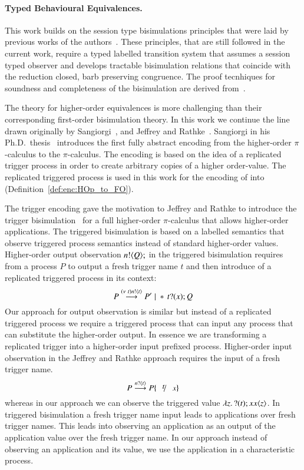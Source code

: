 \paragraph{Typed Behavioural Equivalences.}
This work builds on the session type bisimulations principles
that were laid by previous works of the
authors~\cite{dkphdthesis,DBLP:conf/forte/KouzapasYH11,KY13}.
These principles, that are still followed in the current work,
require a typed labelled transition system
that assumes a session typed observer and develops
tractable bisimulation relations that coincide with
the reduction closed, barb preserving congruence. The
proof tecnhiques for soundness and completeness of the bisimulation
are derived from~\cite{Hennessy07}.

The theory for higher-order equivalences is more challenging than
their corresponding first-order bisimulation theory.
In this work we continue the line drawn originally by
Sangiorgi~\cite{San96H,SangiorgiD:expmpa},
and Jeffrey and Rathke~\cite{DBLP:journals/lmcs/JeffreyR05}.
Sangiorgi in his Ph.D.~thesis~\cite{SangiorgiD:expmpa} introduces
the first fully abstract encoding from the higher-order $\pi$-calculus to
the $\pi$-calculus.
The encoding is based on the idea of a replicated trigger process 
in order to create arbitrary copies of a higher order-value.
The replicated triggered process 
is used in this work for the encoding of \HOp into \sessp
(Definition~\ref{def:enc:HOp_to_FO}).

The trigger encoding gave the motivation to Jeffrey and
Rathke to introduce the trigger bisimulation~\cite{DBLP:journals/lmcs/JeffreyR05}
for a full higher-order $\pi$-calculus that allows
higher-order applications.
The triggered bisimulation is based on a labelled semantics
that observe triggered process semantics instead of standard
higher-order values.
Higher-order output observation $n ! \langle Q \rangle ;$ in the
triggered bisimulation requires from
a process $P$ to output a fresh
trigger name $t$ and then introduce of a replicated triggered process
in its context:
\[
	P \stackrel{(\nu\ t) n ! \langle t \rangle}{\longrightarrow} P' \;|\; \ast\,{} t ? (x) ; Q
\]
Our approach for output observation is similar but instead of 
a replicated triggered process we require a triggered process that 
can input any process that can substitute the higher-order output.
In essence we are transforming a replicated trigger into a higher-order
input prefixed process.
Higher-order input observation in the Jeffrey and Rathke approach requires 
the input of a fresh trigger name.
\[
	P \by{\bactinp{n}{t}} P \subst{t}{x} 
\]
whereas in our approach we can observe the triggered value
$\lambda z.\,? (t) ;{x} x\langle z \rangle$.
In triggered bisimulation a fresh trigger name input leads to applications over
fresh trigger names. This leads into observing an application
as an output of the application value over the fresh trigger name.
In our approach instead of observing an application and its value,
we use the application in a characteristic process.


